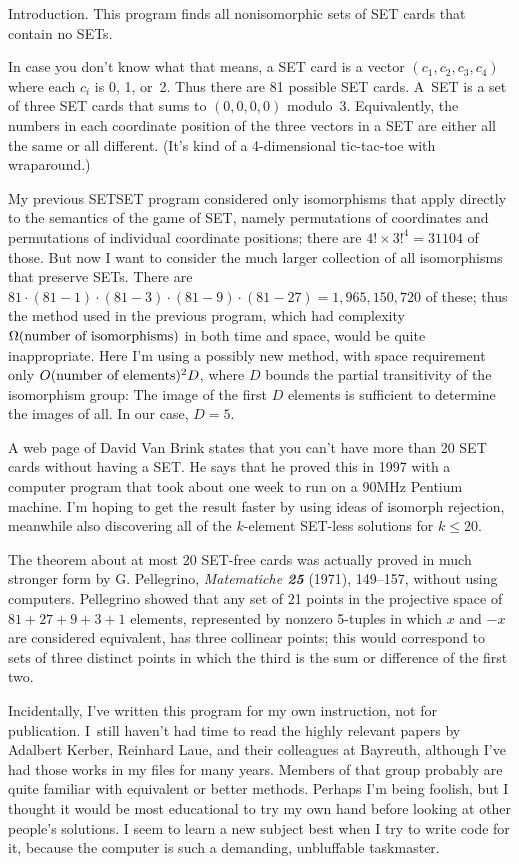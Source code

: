 
\datethis
\def\SET/{{\mc SET\null}}


Introduction. This program finds all nonisomorphic sets of \SET/ cards
that contain no \SET/s.

In case you don't know what that means, a \SET/ card is a vector
$(c_1,c_2,c_3,c_4)$ where each $c_i$ is 0, 1, or~2. Thus there are 81
possible \SET/ cards. A~\SET/ is a set of three \SET/ cards that sums
to $(0,0,0,0)$ modulo~3. Equivalently, the numbers in each coordinate
position of the three vectors in a \SET/ are either all the same or all
different. (It's kind of a 4-dimensional tic-tac-toe with wraparound.)

My previous {\sc SETSET} program considered only isomorphisms that
apply directly to the semantics of the game of \SET/, namely
permutations of coordinates and permutations of individual coordinate
positions; there are $4!\times 3!^4=31104$ of those. But now I want
to consider the much larger collection of all isomorphisms that
preserve \SET/s. There are $81\cdot(81-1)\cdot(81-3)\cdot(81-9)\cdot(81-27)
=1{,}965{,}150{,}720$ of these; thus the method used in the
previous program, which had complexity $\Omega(\hbox{number of isomorphisms})$
in both time and space, would be quite inappropriate. Here I'm using
a possibly new method, with space requirement only
$O(\hbox{number of elements})^2D$, where $D$ bounds the partial
transitivity of the isomorphism group: The image of the first $D$ elements
is sufficient to determine the images of all. In our case, $D=5$.

A web page of David Van Brink states that you can't have more than 20 \SET/
cards without having a \SET/. He says that he proved this in 1997 with a
computer program that took about one week to run on a 90MHz Pentium machine.
I'm hoping to get the result faster by using ideas of isomorph rejection,
meanwhile also discovering all of the $k$-element \SET/-less solutions
for $k\le20$.

The theorem about at most 20 \SET/-free cards was actually proved in much
stronger form by G. Pellegrino, {\sl Matematiche\/ \bf25} (1971), 149--157,
without using computers. Pellegrino showed that any set of 21 points in
the projective space of $81+27+9+3+1$ elements, represented by nonzero
5-tuples in which $x$ and $-x$ are considered equivalent, has three
collinear points; this would correspond to sets of three distinct points
in which the third is the sum or difference of the first two.

Incidentally, I've written this program for my own instruction, not for
publication. I~still haven't had time to read the highly relevant
papers by Adalbert Kerber, Reinhard Laue, and their colleagues at Bayreuth,
although I've
had those works in my files for many years. Members of that group
probably are quite familiar with equivalent or better methods.
Perhaps I'm being foolish, but I thought it would be most educational to try
my own hand before looking at other people's solutions. I seem to learn a new
subject best when I try to write code for it, because the computer is
such a demanding, unbluffable taskmaster.

